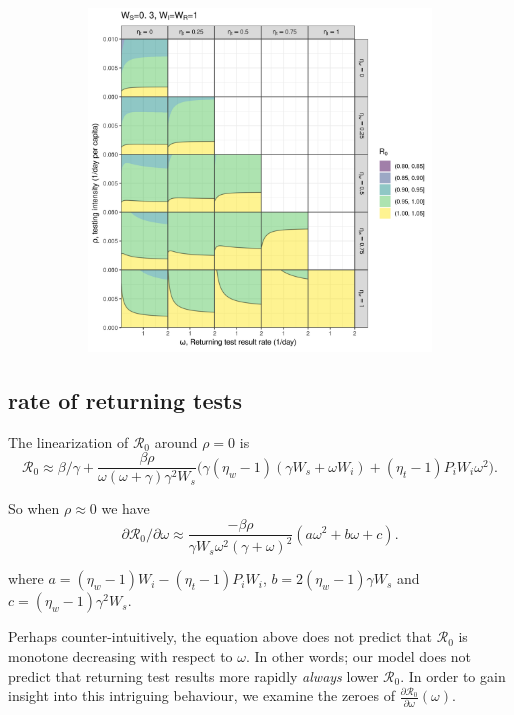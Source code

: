 \documentclass{article}
\newcommand{\Rnum}{\mathcal{R}_0}
\begin{document}
\begin{figure}[h!]
\begin{subfigure}[t]{.45\textwidth}
\includegraphics[width=\linewidth]{./pix/R0contour_TTI.png}
\caption{}\label{fig:res1_b}
\end{subfigure}
\end{figure}

\subsection{rate of returning tests}
The linearization of $\Rnum$ around $\rho=0$ is
\begin{equation}\label{linearization}
\Rnum \approx \beta/\gamma + \frac{\beta \rho}{\omega (\omega+\gamma) \gamma^2 W_s} \Big(\gamma(\eta_w-1)(\gamma W_s+\omega W_i) + (\eta_t -1)P_iW_i \omega^2 \Big). 
\end{equation}

So when $\rho \approx 0$ we have $$\partial{\Rnum}/\partial{\omega} \approx  \frac{-\beta \rho}{\gamma W_s\omega^2 (\gamma+\omega)^2}  (a \omega^2 + b \omega + c).$$

where $a=(\eta_w-1)W_i-(\eta_t-1)P_iW_i$, $b=2(\eta_w-1)\gamma W_s$ and $c=(\eta_w-1)\gamma^2 W_s$. 

Perhaps counter-intuitively, the equation above does not predict that $\Rnum$ is monotone decreasing with respect to $\omega$. In other words; our model does not predict that returning test results more rapidly \textit{always} lower $\Rnum$. In order to gain insight into this intriguing behaviour, we examine the zeroes of $\frac{\partial{\Rnum}}{\partial{\omega}}(\omega)$.
\end{document}
